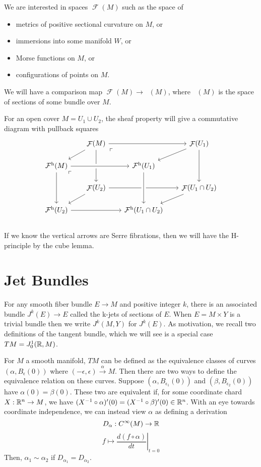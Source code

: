 \documentclass{article}
\newtheorem{proposed work}[theorem]{Proposed Work}
\DeclareMathOperator{\CF}{\mathcal F}
\DeclareMathOperator{\CFh}{\mathcal{F}^{h}} %
\begin{document}
We are interested in spaces $\CF(M)$ such as the space of
\begin{itemize}
  \item metrics of positive sectional curvature on $M$, or
  \item immersions into some manifold $W$, or
  \item Morse functions on $M$, or 
  \item configurations of points on $M$.
\end{itemize}
We will have a comparison map $\CF(M) \to \CFh(M)$, where $\CFh(M)$ is
the space of sections of some bundle over $M$.

For an open cover $M = U_1 \cup U_2$, the sheaf property will give a
commutative diagram with pullback squares
  \[
    \begin{tikzcd}[row sep=scriptsize, column sep=scriptsize]
      & \CF(M) \arrow[dl] \arrow[rr] \arrow[dd] \arrow[dr,
      phantom, "\ulcorner", very near start] & & \CF(U_1) \arrow[dl]
      \arrow[dd] \\
      \CFh(M) \arrow[rr, crossing over] \arrow[dd] \arrow[dr,
      phantom, "\ulcorner", very near start] & & \CFh(U_1) \\
      & \CF(U_2) \arrow[dl] \arrow[rr] & & \CF(U_1\cap U_2) \arrow[dl] \\
      \CFh(U_2) \arrow[rr] & & \CFh(U_1\cap U_2) \arrow[from=uu, crossing over]\\
    \end{tikzcd}
  \]
  If we know the vertical arrows are Serre fibrations, then we will
  have the H-principle by the cube lemma.
  
\section{Jet Bundles}

For any smooth fiber bundle $E \to M$ and positive integer $k$, there is an associated bundle $J^k(E)\to E$ called the k-jets of sections of $E$. When $E=M \times Y$ is a trivial bundle then we write $J^k(M, Y)$ for $J^k(E)$. As motivation, we recall two definitions of the tangent bundle, which we will see is a special case $TM=J^1_0(\mathbb R, M)$.

For $M$ a smooth manifold, $TM$ can be defined as the equivalence classes of curves $(\alpha, B_{\epsilon}(0))$ where $(-\epsilon, \epsilon) \xrightarrow{\alpha} M$. Then there are two ways to define the equivalence relation on these curves. Suppose $(\alpha, B_{\epsilon_1}(0))$ and $(\beta, B_{\epsilon_2}(0))$ have $\alpha(0)=\beta(0)$. These two are equivalent if, for some coordinate chard $X: \mathbb R^n\to M$, we have $(X^{-1}\circ \alpha)'(0) = (X^{-1}\circ \beta)'(0) \in \mathbb R^n$. With an eye towards coordinate independence, we can instead view $\alpha$ as defining a derivation
\[
  D_\alpha: C^\infty(M) \to \mathbb R
\]
\[
  f \mapsto \left.\frac{d(f\circ\alpha)}{dt}\right|_{t=0}
\]
Then, $\alpha_1\sim \alpha_2$ if $D_{\alpha_1}=D_{\alpha_2}$.
\end{document}
